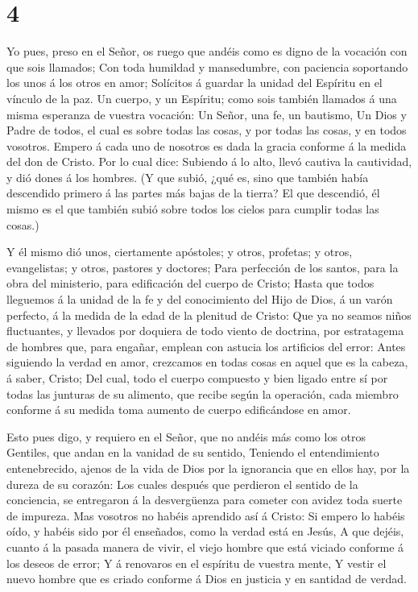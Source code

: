 \hypertarget{section-3}{%
\section{4}\label{section-3}}

 Yo pues, preso en el Señor, os ruego que andéis como es
digno de la vocación con que sois llamados;  Con toda
humildad y mansedumbre, con paciencia soportando los unos á los otros en
amor;  Solícitos á guardar la unidad del Espíritu en el
vínculo de la paz.  Un cuerpo, y un Espíritu; como sois
también llamados á una misma esperanza de vuestra vocación: 
Un Señor, una fe, un bautismo,  Un Dios y Padre de todos, el
cual es sobre todas las cosas, y por todas las cosas, y en todos
vosotros.  Empero á cada uno de nosotros es dada la gracia
conforme á la medida del don de Cristo.  Por lo cual dice:
Subiendo á lo alto, llevó cautiva la cautividad, y dió dones á los
hombres.  (Y que subió, ¿qué es, sino que también había
descendido primero á las partes más bajas de la tierra?  El
que descendió, él mismo es el que también subió sobre todos los cielos
para cumplir todas las cosas.)

 Y él mismo dió unos, ciertamente apóstoles; y otros,
profetas; y otros, evangelistas; y otros, pastores y doctores;
 Para perfección de los santos, para la obra del
ministerio, para edificación del cuerpo de Cristo;  Hasta
que todos lleguemos á la unidad de la fe y del conocimiento del Hijo de
Dios, á un varón perfecto, á la medida de la edad de la plenitud de
Cristo:  Que ya no seamos niños fluctuantes, y llevados por
doquiera de todo viento de doctrina, por estratagema de hombres que,
para engañar, emplean con astucia los artificios del error:
 Antes siguiendo la verdad en amor, crezcamos en todas
cosas en aquel que es la cabeza, á saber, Cristo;  Del
cual, todo el cuerpo compuesto y bien ligado entre sí por todas las
junturas de su alimento, que recibe según la operación, cada miembro
conforme á su medida toma aumento de cuerpo edificándose en amor.

 Esto pues digo, y requiero en el Señor, que no andéis más
como los otros Gentiles, que andan en la vanidad de su sentido,
 Teniendo el entendimiento entenebrecido, ajenos de la vida
de Dios por la ignorancia que en ellos hay, por la dureza de su corazón:
 Los cuales después que perdieron el sentido de la
conciencia, se entregaron á la desvergüenza para cometer con avidez toda
suerte de impureza.  Mas vosotros no habéis aprendido así á
Cristo:  Si empero lo habéis oído, y habéis sido por él
enseñados, como la verdad está en Jesús,  A que dejéis,
cuanto á la pasada manera de vivir, el viejo hombre que está viciado
conforme á los deseos de error;  Y á renovaros en el
espíritu de vuestra mente,  Y vestir el nuevo hombre que es
criado conforme á Dios en justicia y en santidad de verdad.


